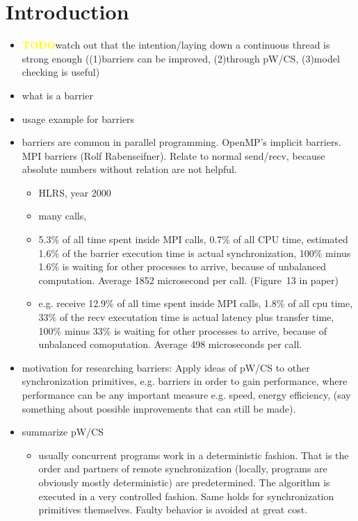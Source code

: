 \documentclass[a4paper, 10pt]{article}
\def \todo{\textbf{\textcolor{yellow}{TODO}}}
\begin{document}
\section{Introduction}
\label{sec:introduction}
\begin{itemize}
	\item \todo watch out that the intention/laying down a continuous thread is strong enough ((1)barriers can be improved, (2)through pW/CS, (3)model checking is useful)
	\item what is a barrier
	\item usage example for barriers
	\item barriers are common in parallel programming. OpenMP's\cite{openmp} implicit barriers. MPI barriers (Rolf Rabenseifner\cite{rab00}). Relate to normal send/recv, because absolute numbers without relation are not helpful.
		\begin{itemize}
			\item HLRS, year 2000
			\item many calls,
			\item 5.3\% of all time spent inside MPI calls, 0.7\% of all CPU time, estimated 1.6\% of the barrier execution time is actual synchronization, 100\% minus 1.6\% is waiting for other processes to arrive, because of unbalanced computation. Average 1852 microsecond per call. (Figure~13 in paper)
			\item e.g. receive 12.9\% of all time spent inside MPI calls, 1.8\% of all cpu time, 33\% of the recv executation time is actual latency plus transfer time, 100\% minus 33\% is waiting for other processes to arrive, because of unbalanced comoputation. Average 498 microseconds per call.
		\end{itemize}
	\item motivation for researching barriers: Apply ideas of pW/CS\cite{pwcs} to other synchronization primitives, e.g. barriers in order to gain performance, where performance can be any important measure e.g. speed, energy efficiency, (say something about possible improvements that can still be made).
	\item summarize pW/CS
		\begin{itemize}
			\item usually concurrent programs work in a deterministic fashion. That is the order and partners of remote synchronization (locally, programs are obviously mostly deterministic) are predetermined. The algorithm is executed in a very controlled fashion. Same holds for synchronization primitives themselves. Faulty behavior is avoided at great cost.

\end{itemize}
\end{itemize}
\end{document}
